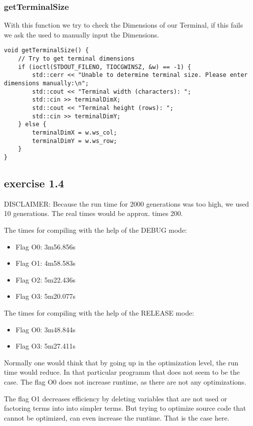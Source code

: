 \documentclass[a4paper]{article}
\begin{document}
\subsubsection{getTerminalSize}
With this function we try to check the Dimensions of our Terminal, if this fails we ask the used to manually input the Dimensions.
\begin{lstlisting}
void getTerminalSize() {
    // Try to get terminal dimensions
    if (ioctl(STDOUT_FILENO, TIOCGWINSZ, &w) == -1) {
        std::cerr << "Unable to determine terminal size. Please enter dimensions manually:\n";
        std::cout << "Terminal width (characters): ";
        std::cin >> terminalDimX;
        std::cout << "Terminal height (rows): ";
        std::cin >> terminalDimY;
    } else {
        terminalDimX = w.ws_col;
        terminalDimY = w.ws_row;
    }
}

\end{lstlisting}
\clearpage
\subsection{exercise 1.4}
DISCLAIMER: Because the run time for 2000 generations was too high, we used 10 generations. The real times would be approx. times 200.

The times for compiling with the help of the DEBUG mode:
\begin{itemize}
    \item Flag O0:  3m56.856s
    \item Flag O1:  4m58.583s
    \item Flag O2:  5m22.436s
    \item Flag O3:  5m20.077s
\end{itemize}
The times for compiling with the help of the RELEASE mode:
\begin{itemize}
    \item Flag O0:  3m48.844s
    \item Flag O3:  5m27.411s
\end{itemize}
Normally one would think that by going up in the optimization level, the run time would reduce. In that particular programm that does not seem to be the case.
The flag O0 does not increase runtime, as there are not any optimizations.

The flag O1 decreases efficiency by deleting variables that are not used or factoring terms into into simpler terms. But trying to optimize source code that cannot be optimized, can even increase the runtime. That is the case here.
\end{document}
